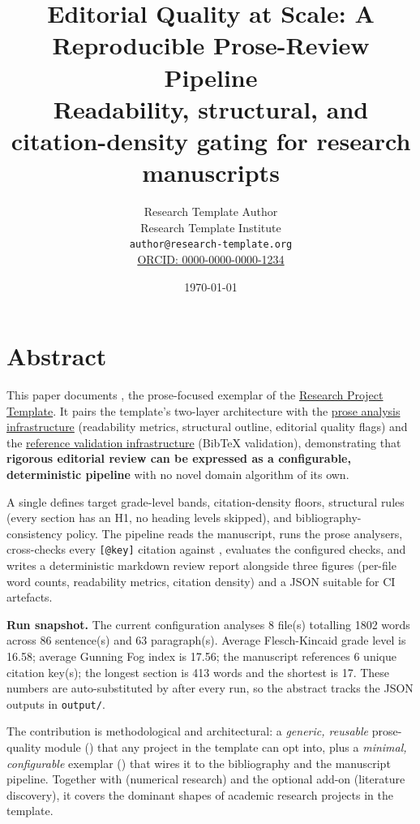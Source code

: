 \documentclass[
]{article}
\author{}
\date{}
\title{Editorial Quality at Scale: A Reproducible Prose-Review Pipeline\\\normalsize Readability, structural, and citation-density gating for research manuscripts}
\author{Research Template Author\\\footnotesize{Research Template Institute}\\\footnotesize{\texttt{author@research-template.org}}\\\footnotesize{\href{https://orcid.org/0000-0000-0000-1234}{ORCID: 0000-0000-0000-1234}}}
\date{\today}
\begin{document}
\maketitle
\thispagestyle{empty}
\tableofcontents
\newpage


\section{Abstract}\label{sec:abstract}

This paper documents , the
prose-focused exemplar of the
\href{https://github.com/docxology/template}{Research Project Template}.
It pairs the template's two-layer architecture with the
\href{https://github.com/docxology/template/tree/main/infrastructure/prose}{prose
analysis infrastructure} (readability metrics, structural outline,
editorial quality flags) and the
\href{https://github.com/docxology/template/tree/main/infrastructure/reference}{reference
validation infrastructure} (BibTeX validation), demonstrating that
\textbf{rigorous editorial review can be expressed as a configurable,
deterministic pipeline} with no novel domain algorithm of its own.

A single  defines target grade-level
bands, citation-density floors, structural rules (every section has an
H1, no heading levels skipped), and bibliography-consistency policy. The
pipeline reads the manuscript, runs the prose analysers, cross-checks
every \texttt{{[}@key{]}} citation against
, evaluates the configured checks, and
writes a deterministic markdown review report alongside three figures
(per-file word counts, readability metrics, citation density) and a JSON
 suitable for CI artefacts.

\textbf{Run snapshot.} The current configuration analyses 8 file(s)
totalling 1802 words across 86 sentence(s) and 63 paragraph(s). Average
Flesch-Kincaid grade level is 16.58; average Gunning Fog index is 17.56;
the manuscript references 6 unique citation key(s); the longest section
is 413 words and the shortest is 17. These numbers are auto-substituted
by  after every
run, so the abstract tracks the JSON outputs in \texttt{output/}.

The contribution is methodological and architectural: a \emph{generic,
reusable} prose-quality module () that any
project in the template can opt into, plus a \emph{minimal,
configurable} exemplar ()
that wires it to the bibliography and the manuscript pipeline. Together
with  (numerical research) and the
optional  add-on
(literature discovery), it covers the dominant shapes of academic
research projects in the template.
\end{document}
